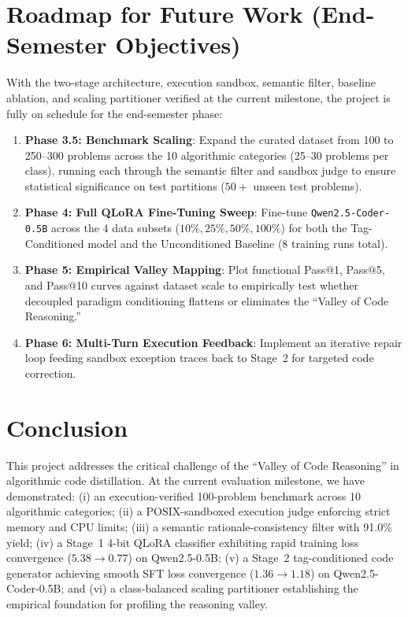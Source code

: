 \documentclass[lettersize,journal]{IEEEtran}
\begin{document}
\section{Roadmap for Future Work (End-Semester Objectives)}
With the two-stage architecture, execution sandbox, semantic filter, baseline ablation, and scaling partitioner verified at the current milestone, the project is fully on schedule for the end-semester phase:
\begin{enumerate}
    \item \textbf{Phase 3.5: Benchmark Scaling}: Expand the curated dataset from 100 to 250--300 problems across the 10 algorithmic categories (25--30 problems per class), running each through the semantic filter and sandbox judge to ensure statistical significance on test partitions ($50+$ unseen test problems).
    \item \textbf{Phase 4: Full QLoRA Fine-Tuning Sweep}: Fine-tune \texttt{Qwen2.5-Coder-0.5B} across the 4 data subsets ($10\%, 25\%, 50\%, 100\%$) for both the Tag-Conditioned model and the Unconditioned Baseline (8 training runs total).
    \item \textbf{Phase 5: Empirical Valley Mapping}: Plot functional Pass@1, Pass@5, and Pass@10 curves against dataset scale to empirically test whether decoupled paradigm conditioning flattens or eliminates the ``Valley of Code Reasoning.''
    \item \textbf{Phase 6: Multi-Turn Execution Feedback}: Implement an iterative repair loop feeding sandbox exception traces back to Stage~2 for targeted code correction.
\end{enumerate}

\section{Conclusion}
This project addresses the critical challenge of the ``Valley of Code Reasoning'' in algorithmic code distillation. At the current evaluation milestone, we have demonstrated: (i) an execution-verified 100-problem benchmark across 10 algorithmic categories; (ii) a POSIX-sandboxed execution judge enforcing strict memory and CPU limits; (iii) a semantic rationale-consistency filter with 91.0\% yield; (iv) a Stage~1 4-bit QLoRA classifier exhibiting rapid training loss convergence ($5.38 \to 0.77$) on Qwen2.5-0.5B; (v) a Stage~2 tag-conditioned code generator achieving smooth SFT loss convergence ($1.36 \to 1.18$) on Qwen2.5-Coder-0.5B; and (vi) a class-balanced scaling partitioner establishing the empirical foundation for profiling the reasoning valley.
\end{document}
